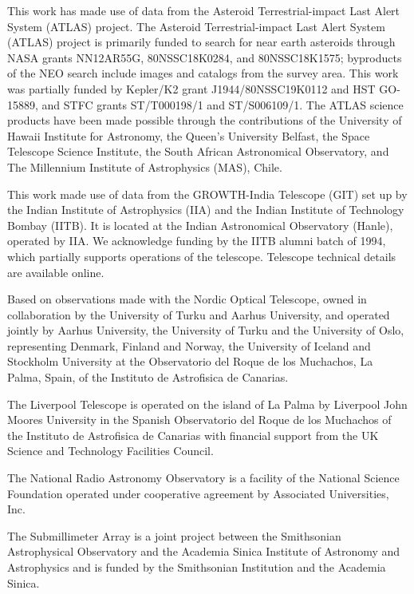 \documentclass{nature_plusfigure}
\begin{document}
\begin{addendum}
This work has made use of data from the Asteroid Terrestrial-impact Last Alert System (ATLAS) project. The Asteroid Terrestrial-impact Last Alert System (ATLAS) project is primarily funded to search for near earth asteroids through NASA grants NN12AR55G, 80NSSC18K0284, and 80NSSC18K1575; byproducts of the NEO search include images and catalogs from the survey area. This work was partially funded by Kepler/K2 grant J1944/80NSSC19K0112 and HST GO-15889, and STFC grants ST/T000198/1 and ST/S006109/1. The ATLAS science products have been made possible through the contributions of the University of Hawaii Institute for Astronomy, the Queen’s University Belfast, the Space Telescope Science Institute, the South African Astronomical Observatory, and The Millennium Institute of Astrophysics (MAS), Chile.

This work made use of data from the GROWTH-India Telescope (GIT) set up by the Indian Institute of Astrophysics (IIA) and the Indian Institute of Technology Bombay (IITB). It is located at the Indian Astronomical Observatory (Hanle), operated by IIA. We acknowledge funding by the IITB alumni batch of 1994, which partially supports operations of the telescope. Telescope technical details are available online.\cite{growth_india}

Based on observations made with the Nordic Optical Telescope, owned in collaboration by the University of Turku and Aarhus University, and operated jointly by Aarhus University, the University of Turku and the University of Oslo, representing Denmark, Finland and Norway, the University of Iceland and Stockholm University at the Observatorio del Roque de los Muchachos, La Palma, Spain, of the Instituto de Astrofisica de Canarias.

The Liverpool Telescope is operated on the island of La Palma by Liverpool John Moores University in the Spanish Observatorio del Roque de los Muchachos of the Instituto de Astrofisica de Canarias with financial support from the UK Science and Technology Facilities Council.

The National Radio Astronomy Observatory is a facility of the National Science Foundation operated under cooperative agreement by Associated Universities, Inc.

The Submillimeter Array is a joint project between the Smithsonian Astrophysical Observatory and the Academia Sinica Institute of Astronomy and Astrophysics and is funded by the Smithsonian Institution and the Academia Sinica.


\end{addendum}
\end{document}
